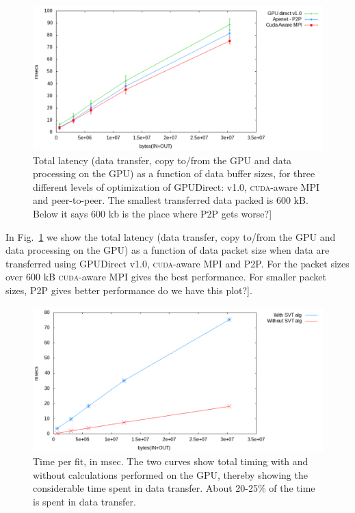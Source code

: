 \documentclass[a4]{jpconf}
\providecommand{\fixme}[1]{\xspace{\sffamily{[\bfseries{}FIXME:} #1]}}
\begin{document}
\begin{figure}[tbp]
  \centering
  \includegraphics[width=0.9\linewidth]{figures/datatransfer}
  \caption{Total latency (data transfer, copy to/from the GPU and data
    processing on the GPU) as a function of data buffer sizes, for
    three different levels of optimization of GPUDirect: v1.0,
    \textsc{cuda}-aware MPI and peer-to-peer. The smallest transferred
    data packed is 600 kB. \fixme{Below it says 600 kb is the place where
    P2P gets worse?}}
  \label{fig:xferlatency}
\end{figure}

In Fig.~\ref{fig:xferlatency} we show the total latency (data
transfer, copy to/from the GPU and data processing on the GPU) as a
function of data packet size when data are transferred using GPUDirect
v1.0, \textsc{cuda}-aware MPI and P2P. For the packet sizes over 600
kB \textsc{cuda}-aware MPI gives the best performance. For smaller
packet sizes, P2P gives better performance \fixme{do we have this plot?}.


\begin{figure}[tbp]
  \centering
  \includegraphics[width=0.9\linewidth]{figures/cudaware}
  \caption{Time per fit, in msec. The two curves show total timing
    with and without calculations performed on the GPU, thereby
    showing the considerable time spent in data transfer. About
    20-25\% of the time is spent in data transfer.}
  \label{fig:transferOnly}
\end{figure}
\end{document}

